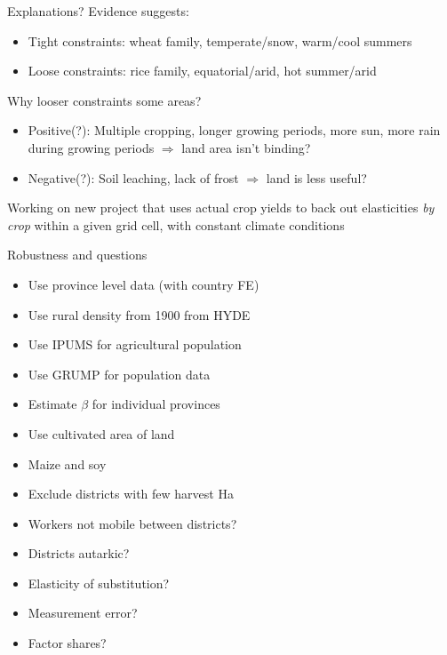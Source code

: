 \documentclass[10pt, xcolor=dvipsnames]{beamer}
\begin{document}
\begin{frame}{Explanations?}
Evidence suggests:
\begin{itemize}
  \item Tight constraints: wheat family, temperate/snow, warm/cool summers
  \item Loose constraints: rice family, equatorial/arid, hot summer/arid
\end{itemize}

\vspace{.2cm} Why looser constraints some areas?
\begin{itemize}
  \item Positive(?): Multiple cropping, longer growing periods, more sun, more rain during growing periods $\Rightarrow$ land area isn't binding?
  \item Negative(?): Soil leaching, lack of frost $\Rightarrow$ land is less useful?
\end{itemize}

\vspace{.2cm} Working on new project that uses actual crop yields to back out elasticities \textit{by crop} within a given grid cell, with constant climate conditions
\end{frame}

\begin{frame}{Robustness and questions}\label{robustness}
\begin{itemize}
  \item Use province level data (with country FE) \hyperlink{regprov}{}
  \item Use rural density from 1900 from HYDE \hyperlink{reg1900}{}
  \item Use IPUMS for agricultural population \hyperlink{ipums}{}
  \item Use GRUMP for population data \hyperlink{grump}{}
  \item Estimate $\beta$ for individual provinces \hyperlink{prov}{}
  \item Use cultivated area of land \hyperlink{cultreg}{}
  \item Maize and soy \hyperlink{othercrop}{}
  \item Exclude districts with few harvest Ha \hyperlink{harvarea}{}
  \item Workers not mobile between districts? \hyperlink{nonmobile}{}
  \item Districts autarkic? \hyperlink{autarky}{}  
  \item Elasticity of substitution? \hyperlink{eos}{}
  \item Measurement error? \hyperlink{measure}{}
  \item Factor shares? \hyperlink{shares}{}
\end{itemize}
\end{frame}
\end{document}
